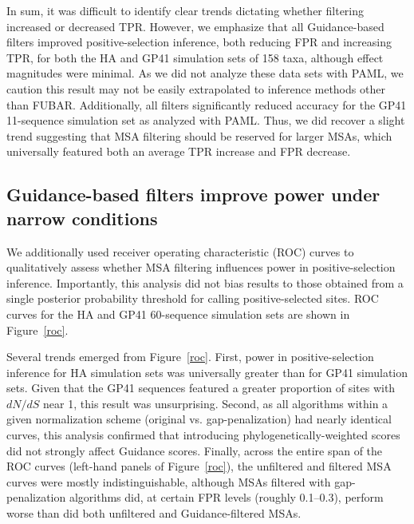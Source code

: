 \documentclass[11pt]{article}
\begin{document}
In sum, it was difficult to identify clear trends dictating whether filtering increased or decreased TPR. However, we emphasize that all Guidance-based filters improved positive-selection inference, both reducing FPR and increasing TPR, for both the HA and GP41 simulation sets of 158 taxa, although effect magnitudes were minimal. As we did not analyze these data sets with PAML, we caution this result may not be easily extrapolated to inference methods other than FUBAR. Additionally, all filters significantly reduced accuracy for the GP41 11-sequence simulation set as analyzed with PAML. Thus, we did recover a slight trend suggesting that MSA filtering should be reserved for larger MSAs, which universally featured both an average TPR increase and FPR decrease.

\subsection*{Guidance-based filters improve power under narrow conditions}

We additionally used receiver operating characteristic (ROC) curves to qualitatively assess whether MSA filtering influences power in positive-selection inference. Importantly, this analysis did not bias results to those obtained from a single posterior probability threshold for calling positive-selected sites. ROC curves for the HA and GP41 60-sequence simulation sets are shown in Figure~\ref{roc}. 

Several trends emerged from Figure~\ref{roc}. First, power in positive-selection inference for HA simulation sets was universally greater than for GP41 simulation sets. Given that the GP41 sequences featured a greater proportion of sites with $dN/dS$ near 1, this result was unsurprising. Second, as all algorithms within a given normalization scheme (original vs. gap-penalization) had nearly identical curves, this analysis confirmed that introducing phylogenetically-weighted scores did not strongly affect Guidance scores. Finally, across the entire span of the ROC curves (left-hand panels of Figure~\ref{roc}), the unfiltered and filtered MSA curves were mostly indistinguishable, although MSAs filtered with gap-penalization algorithms did, at certain FPR levels (roughly 0.1--0.3), perform worse than did both unfiltered and Guidance-filtered MSAs. 
\end{document}
